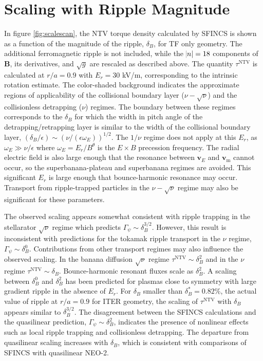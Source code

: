 \documentclass[aip, pop, preprint]{revtex4-1}
\numberwithin{figure}{section}
\numberwithin{equation}{section}
\begin{document}
\FloatBarrier

\section{Scaling with Ripple Magnitude}\label{scaling}
In figure \ref{fig:scalescan}, the NTV torque density calculated by SFINCS is shown as a function of the magnitude of the ripple, $\delta_B$, for TF only geometry. The additional ferromagnetic ripple is not included, while the $\abs{n}=18$ components of $\bm{B}$, its derivatives, and $\sqrt{g}$ are rescaled as described above. The quantity $\tau^{\mathrm{NTV}}$ is calculated at $r/a = 0.9$ with $E_r = 30$ kV/m, corresponding to the intrinsic rotation estimate. The color-shaded background indicates the approximate regions of applicability of the collisional boundary layer ($\nu-\sqrt{\nu}$) and the collisionless detrapping ($\nu$) regimes. The boundary between these regimes corresponds to the $\delta_B$ for which the width in pitch angle of the detrapping/retrapping layer is similar to the width of the collisional boundary layer, $(\delta_B/\epsilon) \sim (\nu/(\epsilon \omega_E))^{1/2}$. The $1/\nu$ regime \cite{Shaing2003} does not apply at this $E_r$, as $\omega_E \gg \nu/\epsilon$ where $\omega_E = E_r/B^{\theta}$ is the $E\times B$ precession frequency. The radial electric field is also large enough that the resonance between $\bm{v}_{E}$ and $\bm{v}_{\mathrm{m}}$ cannot occur, so the superbanana-plateau \cite{Shaing2009_sbp} and superbanana \cite{Shaing2009_sb} regimes are avoided. This significant $E_r$ is large enough that bounce-harmonic resonance may occur.\cite{Park2009} Transport from ripple-trapped particles in the $\nu- \sqrt{\nu}$ regime may also be significant for these parameters.

The observed scaling appears somewhat consistent with ripple trapping in the stellarator $\sqrt{\nu}$ regime \cite{Ho1987} which predicts $\Gamma_{\psi} \sim \delta_B^{3/2}$. However, this result is inconsistent with predictions for the tokamak ripple transport in the $\nu$ regime, $\Gamma_{\psi} \sim \delta_B^0$.\cite{Tsang1977,Linsker1982} Contributions from other transport regimes may also influence the observed scaling. In the banana diffusion $\sqrt{\nu}$ regime $\tau^{\mathrm{NTV}} \sim \delta_B^2$ and in the $\nu$ regime $\tau^{\mathrm{NTV}} \sim \delta_B$. Bounce-harmonic resonant fluxes scale as $\delta_B^2$.\cite{Park2009} A scaling between $\delta_B^0$ and $\delta_B^{2}$ has been predicted for plasmas close to symmetry with large gradient ripple in the absence of $E_r$.\cite{Calvo2014} For $\delta_B$ smaller than $\delta_B^* = 0.82\%$, the actual value of ripple at $r/a=0.9$ for ITER geometry, the scaling of $\tau^{\mathrm{NTV}}$ with $\delta_B$ appears similar to $\delta_B^{3/2}$. The disagreement between the SFINCS calculations and the quasilinear prediction, $\Gamma_{\psi} \sim \delta_B^2$, indicates the presence of nonlinear effects such as local ripple trapping and collisionless detrapping. The departure from quasilinear scaling increases with $\delta_B$, which is consistent with comparisons of SFINCS with quasilinear NEO-2.\cite{Martitsch2016} 
\end{document}
